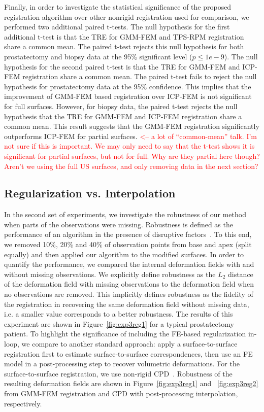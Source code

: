 \documentclass[journal]{IEEEtran}
\newcommand{\comment}[1]{\textcolor{red}{#1}}
\begin{document}
Finally, in order to investigate the statistical significance of the proposed registration algorithm over other nonrigid registration used for comparison, we performed two  additional paired t-tests. The null hypothesis for the first additional t-test is that the TRE for GMM-FEM and TPS-RPM registration share a common mean. The paired t-test rejects this null hypothesis for both prostatectomy and biopsy data at the 95\% significant level ($p\leq1e-9$). The null hypothesis for the second paired t-test is that the TRE for GMM-FEM and ICP-FEM registration share a common mean. The paired t-test fails to reject the null hypothesis for prostatectomy data at the 95\% confidence. This implies that the improvement of GMM-FEM based registration over ICP-FEM is not significant for full surfaces. However, for biopsy data, the paired t-test rejects the null hypothesis that the TRE for GMM-FEM and ICP-FEM registration share a common mean. This result suggests that the GMM-FEM registration significantly outperforms ICP-FEM for partial surfaces.  \comment{<-- a lot of ``common-mean'' talk.  I'm not sure if this is important.  We may only need to say that the t-test shows it is significant for partial surfaces, but not for full.  Why are they partial here though?  Aren't we using the full US surfaces, and only removing data in the next section?}

\subsection{Regularization vs. Interpolation}\label{sec:exp2}
In the second set of experiments, we investigate the robustness of our method when parts of the observations were missing. Robustness is defined as the performance of an algorithm in the presence of disruptive factors~\cite{Jannin02a}. To this end, we removed 10\%, 20\% and 40\% of observation points from base and apex (split equally) and then applied our algorithm to the modified surfaces. In order to quantify the performance, we compared the internal deformation fields with and without missing observations. We explicitly define robustness as the $L_2$ distance of the deformation field with missing observations to the deformation field when no observations are removed. This implicitly defines robustness as the fidelity of the registration in recovering the same deformation field without missing data, i.e. a smaller value corresponds to a better robustness. The results of this experiment are shown in Figure~\ref{fig:exp3reg1} for a typical prostatectomy patient. To highlight the significance of including the FE-based regularization in-loop, we compare to another standard approach: apply a surface-to-surface registration first to estimate surface-to-surface correspondences, then use an FE model in a post-processing step to recover volumetric deformations. For the surface-to-surface registration, we use non-rigid CPD~\cite{Myronenko10a}.  Robustness of the resulting deformation fields are shown in Figure~\ref{fig:exp3reg1} and ~\ref{fig:exp3reg2} from GMM-FEM registration and CPD with post-processing interpolation, respectively.
\end{document}
